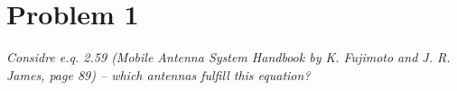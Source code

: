 \section{Problem 1}
\textit{Considre e.q. 2.59 (Mobile Antenna System Handbook by K. Fujimoto and J. R. James, page 89) – which antennas fulfill this equation?}